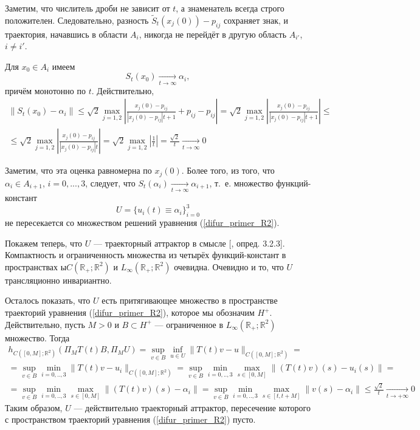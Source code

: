 Заметим, что числитель дроби не зависит от $t$, а знаменатель всегда строго положителен.
Следовательно, разность $\tilde{S}_t(x_j(0)) - p_{ij}$ сохраняет знак,
и траектория, начавшись в области $A_i$, никогда не перейдёт в другую область $A_{i'}$, $i \neq i'$.

Для $x_0 \in A_i$ имеем
\begin{equation}\label{primer_R2_stremlenie}
	S_t(x_0) \xrightarrow[t \to \infty]{} \alpha_{i},
\end{equation}
причём монотонно по $t$.
Действительно,
\begin{multline}
	\|S_t(x_0) - \alpha_i\| \leq
	\sqrt{2} \max_{j=1,2} \left| \frac{x_{j}(0)-p_{ij}}{|x_{j}(0)-p_{ij}|t+1} + p_{ij} - p_{ij}  \right| =
	\sqrt{2} \max_{j=1,2} \left| \frac{x_{j}(0)-p_{ij}}{|x_{j}(0)-p_{ij}|t+1} \right| \leq
	\\ \leq
	\sqrt{2} \max_{j=1,2} \left| \frac{x_{j}(0)-p_{ij}}{|x_{j}(0)-p_{ij}|t} \right| =
	\sqrt{2} \max_{j=1,2} \left| \frac{1}{t} \right| =
	\frac{\sqrt{2}}{t} \xrightarrow[t \to \infty]{} 0
\end{multline}

Заметим, что эта оценка равномерна по $x_{j}(0)$.
Более того, из того, что $\alpha_i \in A_{i+1}$, $i=0,...,3$,
следует, что $S_t(\alpha_i) \xrightarrow[t \to \infty]{} \alpha_{i+1}$,
т.~е. множество функций-констант
$$
	U = \{ u_i(t) \equiv \alpha_i \}_{i=0}^{3}
$$
не пересекается со множеством решений уравнения (\ref{difur_primer_R2}).

Покажем теперь, что $U$ --- траекторный аттрактор в смысле [\cite{Zelenaya}, опред. 3.2.3].
Компактность и ограниченность множества из четырёх функций-констант в пространствах
ы$C(\mathbb{R}_+; \mathbb{R}^2)$ и $L_\infty(\mathbb{R}_+; \mathbb{R}^2)$ очевидна.
Очевидно и то, что $U$ трансляционно инвариантно.

Осталось показать, что $U$ есть притягивающее множество в пространстве траекторий уравнения (\ref{difur_primer_R2}),
которое мы обозначим $H^+$.
Действительно, пусть $M>0$ и $B\subset H^+$ --- ограниченное в $L_\infty(\mathbb{R}_+; \mathbb{R}^2)$ множество.
Тогда
\begin{multline*}
	h_{C([0,M];\mathbb{R}^2)}(\Pi_M T(t)B,\Pi_M U) =
	\sup_{v\in B} \inf_{u\in U} \| T(t) v - u \|_{C([0,M];\mathbb{R}^2)} =
	\\ =
	\sup_{v\in B} \min_{i=0,..,3} \| T(t) v - u_i \|_{C([0,M];\mathbb{R}^2)} =
	\sup_{v\in B} \min_{i=0,..,3} \max_{s\in[0,M]} \| (T(t) v)(s) - u_i(s) \| =
	\\ =
	\sup_{v\in B} \min_{i=0,..,3} \max_{s\in[0,M]} \| (T(t) v)(s) - \alpha_i \| =
	\sup_{v\in B} \min_{i=0,..,3} \max_{s\in[t,t+M]} \| v(s) - \alpha_i \| \leq
	\frac{\sqrt{2}}{t} \xrightarrow[t\to + \infty]{} 0
\end{multline*}
Таким образом, $U$ --- действительно траекторный аттрактор, пересечение которого с пространством траекторий
уравнения (\ref{difur_primer_R2}) пусто.

